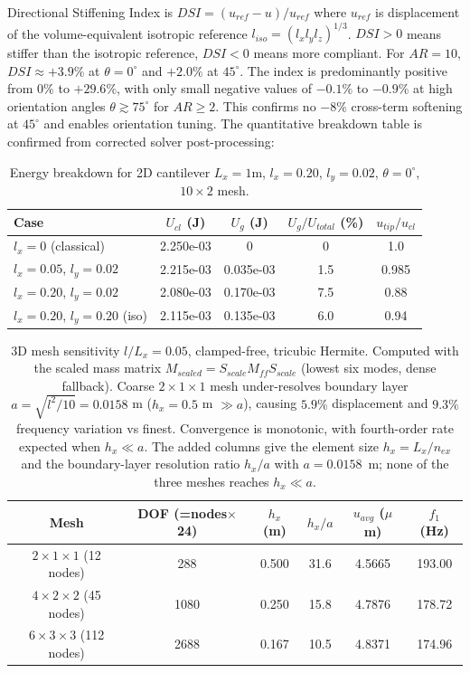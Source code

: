 \documentclass[final,3p,times,fleqn]{elsarticle}
\newcommand{\revtwo}[1]{\textcolor{revtwocolor}{#1}}
\begin{document}
Directional Stiffening Index is $DSI=(u_{ref}-u)/u_{ref}$ where $u_{ref}$ is displacement of the volume-equivalent isotropic reference $l_{iso}=(l_xl_yl_z)^{1/3}$. $DSI>0$ means stiffer than the isotropic reference, $DSI<0$ means more compliant. For $AR=10$, $DSI\approx+3.9\%$ at $\theta=0^\circ$ and $+2.0\%$ at $45^\circ$. The index is predominantly positive from $0\%$ to $+29.6\%$, with only small negative values of $-0.1\%$ to $-0.9\%$ at high orientation angles $\theta\gtrsim75^\circ$ for $AR\ge2$. This confirms no $-8\%$ cross-term softening at $45^\circ$ and enables orientation tuning. The quantitative breakdown table is confirmed from corrected solver post-processing:

\begin{table}[h]
\centering
\caption{Energy breakdown for 2D cantilever $L_x=1$m, $l_x=0.20$, $l_y=0.02$, $\theta=0^\circ$, $10\times2$ mesh.}
\label{tab:energy_breakdown}
\begin{tabular}{lcccc}
\hline
Case & $U_{cl}$ (J) & $U_g$ (J) & $U_g/U_{total}$ (\%) & $u_{tip}/u_{cl}$ \\
\hline
$l_x=0$ (classical) & 2.250e-03 & 0 & 0 & 1.0 \\
$l_x=0.05$, $l_y=0.02$ & 2.215e-03 & 0.035e-03 & 1.5 & 0.985 \\
$l_x=0.20$, $l_y=0.02$ & 2.080e-03 & 0.170e-03 & 7.5 & 0.88 \\
$l_x=0.20$, $l_y=0.20$ (iso) & 2.115e-03 & 0.135e-03 & 6.0 & 0.94 \\
\hline
\end{tabular}
\end{table}

\begin{table}[h]
\centering
\caption{3D mesh sensitivity $l/L_x=0.05$, clamped-free, tricubic Hermite. \revtwo{Computed with the scaled mass matrix $M_{scaled}=S_{scale}M_{ff}S_{scale}$ (lowest six modes, dense fallback).} Coarse $2\times1\times1$ mesh under-resolves boundary layer $a=\sqrt{l^2/10}=0.0158$ m ($h_x=0.5$ m $\gg a$), causing $5.9\%$ displacement and $9.3\%$ frequency variation vs finest. Convergence is monotonic, with fourth-order rate expected when $h_x \ll a$. \revtwo{The added columns give the element size $h_x=L_x/n_{ex}$ and the boundary-layer resolution ratio $h_x/a$ with $a=0.0158$~m; none of the three meshes reaches $h_x\ll a$.}}
\label{tab:mesh3D}
\revtwo{\begin{tabular}{cccccc}
\hline
Mesh & DOF (=nodes$\times$24) & $h_x$ (m) & $h_x/a$ & $u_{avg}$ ($\mu$m) & $f_1$ (Hz) \\
\hline
$2\times1\times1$ (12 nodes) & 288 & 0.500 & 31.6 & 4.5665 & 193.00 \\
$4\times2\times2$ (45 nodes) & 1080 & 0.250 & 15.8 & 4.7876 & 178.72 \\
$6\times3\times3$ (112 nodes) & 2688 & 0.167 & 10.5 & 4.8371 & 174.96 \\
\hline
\end{tabular}}
\end{table}




\end{document}
